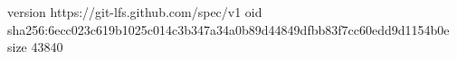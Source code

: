 version https://git-lfs.github.com/spec/v1
oid sha256:6ecc023c619b1025c014c3b347a34a0b89d44849dfbb83f7cc60edd9d1154b0e
size 43840
